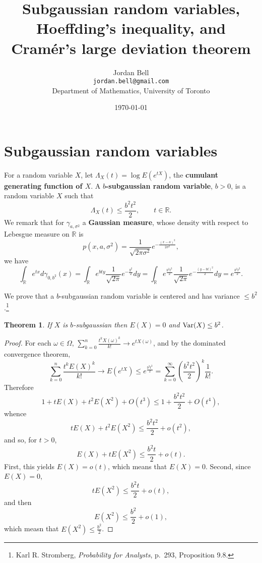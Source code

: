 \documentclass{article}
\newcommand{\Var}{\ensuremath\mathrm{Var}}
\newtheorem{theorem}{Theorem}
\theoremstyle{definition}
\begin{document}
\title{Subgaussian random variables, Hoeffding's inequality, and Cram\'er's large deviation theorem}
\author{Jordan Bell\\ \texttt{jordan.bell@gmail.com}\\Department of Mathematics, University of Toronto}
\date{\today}

\maketitle


\section{Subgaussian random variables}
For a random variable $X$, let $\Lambda_X(t)=\log E(e^{tX})$, the 
\textbf{cumulant generating function of $X$}.
A \textbf{$b$-subgaussian random variable}, $b>0$, is a random variable $X$ such that
\[
\Lambda_X(t) \leq \frac{b^2 t^2}{2}, \qquad t \in \mathbb{R}.
\]
We remark that for $\gamma_{a,\sigma^2}$ a \textbf{Gaussian measure}, whose density with respect to Lebesgue
measure on $\mathbb{R}$ is
\[
p(x,a,\sigma^2)= \frac{1}{\sqrt{2\pi \sigma^2}} e^{-\frac{(x-a)^2}{2\sigma^2}},
\]
we have
\[
\int_\mathbb{R} e^{tx} d\gamma_{0,b^2}(x)
=\int_\mathbb{R} e^{bty} \frac{1}{\sqrt{2\pi}} e^{-\frac{y^2}{2}} dy
=\int_\mathbb{R} e^{\frac{b^2 t^2}{2}} \frac{1}{\sqrt{2\pi}} e^{-\frac{(y-bt)^2}{2}} dy
=e^{\frac{b^2t^2}{2}}.
\]

We prove that a $b$-subgaussian random variable is centered and has variance $\leq b^2$.\footnote{Karl  R. Stromberg,
{\em Probability for Analysts}, p.~293, Proposition 9.8.}


\begin{theorem}
If $X$ is $b$-subgaussian then $E(X)=0$ and $\Var(X) \leq b^2$. 
\end{theorem}
\begin{proof}
For each $\omega \in \Omega$,
$\sum_{k=0}^n \frac{t^k X(\omega)^k}{k!} \to e^{tX(\omega)}$, and by the dominated convergence theorem,
\[
\sum_{k=0}^n \frac{t^k E(X)^k}{k!} \to E(e^{tX}) \leq e^{\frac{b^2t^2}{2}}
=\sum_{k=0}^\infty \left(\frac{b^2 t^2}{2}\right)^k \frac{1}{k!}.
\]
Therefore
\[
1+tE(X)+t^2E(X^2) + O(t^3) \leq 1+\frac{b^2t^2}{2}+O(t^4),
\]
whence
\[
tE(X)+t^2E(X^2) \leq  \frac{b^2t^2}{2} + o(t^2),
\]
and so, for $t>0$,
\[
E(X)+tE(X^2) \leq \frac{b^2 t}{2} + o(t).
\]
First, this yields $E(X) = o(t)$, which means that $E(X)=0$. Second,
since $E(X)=0$, 
\[
tE(X^2) \leq \frac{b^2t}{2}+o(t),
\]
and then
\[
E(X^2) \leq \frac{b^2}{2}+o(1),
\]
which measn that $E(X^2) \leq \frac{b^2}{2}$.
\end{proof}
\end{document}
